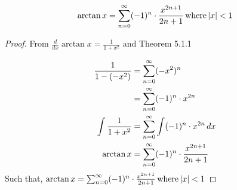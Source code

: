 \begin{lemma}
  \[
    \arctan{x} = \sum_{n=0}^{\infty} (-1)^n \cdot \frac{x^{2n+1}}{2n+1} \, \mathrm{where} \, |x| < 1
  \]
\end{lemma}

\begin{proof}
  From \(\frac{d}{dx} \arctan{x} = \frac{1}{1+x^2}\) and Theorem 5.1.1

  \begin{equation}
    \nonumber
    \begin{aligned}
      \frac{1}{1 - (-x^2)} &= \sum_{n=0}^{\infty} (-x^2)^n \\
      &= \sum_{n=0}^{\infty} (-1)^n \cdot x^{2n} \\
      \int \frac{1}{1 + x^2} &= \sum_{n=0}^{\infty} \int (-1)^n \cdot x^{2n} \, dx \\
      \arctan{x} &= \sum_{n=0}^{\infty} (-1)^n \cdot \frac{x^{2n+1}}{2n+1}
    \end{aligned}
  \end{equation}
  Such that, \(\arctan{x} = \sum_{n=0}^{\infty} (-1)^n \cdot \frac{x^{2n+1}}{2n+1} \, \mathrm{where} \, |x| < 1 \)
\end{proof}

